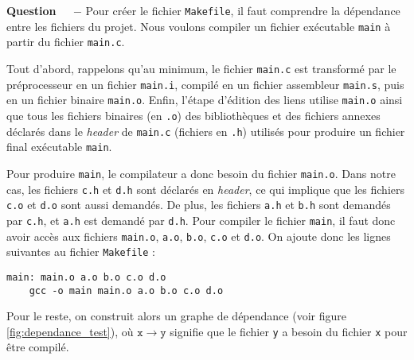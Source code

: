 \documentclass[11pt]{article}
\newcounter{question}[section]
\newenvironment{question}[1][]{\refstepcounter{question}\par\medskip
   \noindent\textbf{Question~\thequestion ~ $-$} \rmfamily}{}
\begin{document}
\begin{question}
Pour créer le fichier \texttt{Makefile}, il faut comprendre la dépendance entre les fichiers du projet.
Nous voulons compiler un fichier exécutable \texttt{main} à partir du fichier \texttt{main.c}.

Tout d'abord, rappelons qu'au minimum, le fichier \texttt{main.c} est transformé par le préprocesseur en un fichier \texttt{main.i}, compilé en un fichier assembleur \texttt{main.s}, puis en un fichier binaire \texttt{main.o}. Enfin, l'étape d'édition des liens utilise \texttt{main.o} ainsi que tous les fichiers binaires (en \texttt{.o}) des bibliothèques et des fichiers annexes déclarés dans le \textit{header} de \texttt{main.c} (fichiers en \texttt{.h}) utilisés pour produire un fichier final exécutable \texttt{main}.


Pour produire \texttt{main}, le compilateur a donc besoin du fichier \texttt{main.o}. Dans notre cas, les fichiers \texttt{c.h} et \texttt{d.h} sont déclarés en \textit{header}, ce qui implique que les fichiers \texttt{c.o} et \texttt{d.o} sont aussi demandés. De plus, les fichiers \texttt{a.h} et \texttt{b.h} sont demandés par \texttt{c.h}, et \texttt{a.h} est demandé par \texttt{d.h}. Pour compiler le fichier \texttt{main}, il faut donc avoir accès aux fichiers \texttt{main.o}, \texttt{a.o}, \texttt{b.o}, \texttt{c.o} et \texttt{d.o}.
On ajoute donc les lignes suivantes au fichier \texttt{Makefile} :
\begin{verbatim}
main: main.o a.o b.o c.o d.o
    gcc -o main main.o a.o b.o c.o d.o
\end{verbatim}

Pour le reste, on construit alors un graphe de dépendance (voir figure \ref{fig:dependance_test}), où $\mathtt{x}\rightarrow \mathtt{y}$ signifie que le fichier \texttt{y} a besoin du fichier \texttt{x} pour être compilé.



\end{question}
\end{document}
